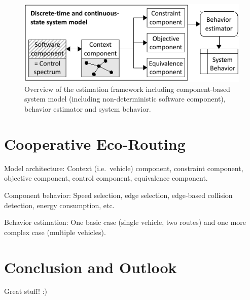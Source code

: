 \documentclass[conference]{../cls/IEEEtran}
\begin{document}
\begin{figure}[b]
	\centering
	\includegraphics{../gfx/framework.pdf}
	\caption{Overview of the estimation framework including component-based system model (including non-deterministic software component), behavior estimator and system behavior.}
	\label{figure:framework}
\end{figure}

\section{Cooperative Eco-Routing}

Model architecture: Context (i.e.\ vehicle) component, constraint component, objective component, control component, equivalence component.

Component behavior: Speed selection, edge selection, edge-based collision detection, energy consumption, etc.

Behavior estimation: One basic case (single vehicle, two routes) and one more complex case (multiple vehicles).

\section{Conclusion and Outlook}

Great stuff! :)



\end{document}
